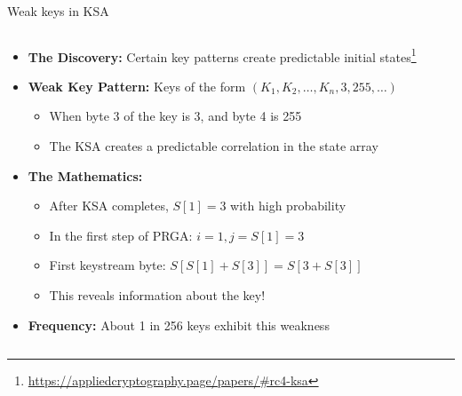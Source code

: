 \documentclass[aspectratio=169, lualatex, handout]{beamer}
\begin{document}
\begin{frame}{Weak keys in KSA}
	\begin{columns}[c]
		\begin{column}{1\textwidth}
			\begin{itemize}[<+->]
				\item \textbf{The Discovery:} Certain key patterns create predictable initial states\footnote{\url{https://appliedcryptography.page/papers/\#rc4-ksa}}
				\item \textbf{Weak Key Pattern:} Keys of the form $(K_1, K_2, \ldots, K_n, 3, 255, \ldots)$
				      \begin{itemize}[<+->]
					      \item When byte 3 of the key is 3, and byte 4 is 255
					      \item The KSA creates a predictable correlation in the state array
				      \end{itemize}
				\item \textbf{The Mathematics:}
				      \begin{itemize}[<+->]
					      \item After KSA completes, $S[1] = 3$ with high probability
					      \item In the first step of PRGA: $i = 1, j = S[1] = 3$
					      \item First keystream byte: $S[S[1] + S[3]] = S[3 + S[3]]$
					      \item This reveals information about the key!
				      \end{itemize}
				\item \textbf{Frequency:} About 1 in 256 keys exhibit this weakness
			\end{itemize}
		\end{column}
	\end{columns}
\end{frame}
\end{document}
